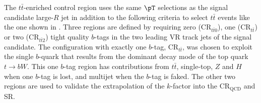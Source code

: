 The $t\bar{t}$-enriched control region uses the same $\pT$ selections as the
signal candidate large-$R$ jet in addition to the following criteria to select
$t\bar{t}$ events like the one shown in .
Three regions are defined by requiring zero ($\text{CR}_{t\bar{t}0}$), one
($\text{CR}_{t\bar{t}}$) or two ($\text{CR}_{t\bar{t}2}$) tight quality
$b$-tags in the two leading VR track jets of the signal candidate. The
configuration with exactly one $b$-tag, $\text{CR}_{t\bar{t}}$, was chosen
to exploit the single $b$-quark that results from the dominant decay mode of
the top quark $t \rightarrow bW$.  This one $b$-tag region has contributions from
$t\bar{t}$, single-top, $Z$ and $H$ when one $b$-tag is lost, and multijet when
the $b$-tag is faked.  The other two regions are used to validate the
extrapolation of the $k$-factor into the $\text{CR}_{\text{QCD}}$ and SR.

